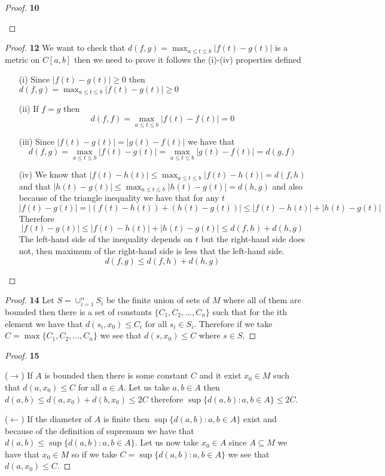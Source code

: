 \documentclass[11pt]{article}
\theoremstyle{definition}
\begin{document}
\begin{proof}{\textbf{10}}
\begin{itemize}
        \end{itemize}
    \end{proof}
\cleardoublepage
	\begin{proof}{\textbf{12}}
        We want to check that $d(f,g) = \max_{a\leq t\leq b} |f(t) - g(t)|$ is a metric
        on $C[a,b]$ then we need to prove it follows the (i)-(iv) properties defined
        \begin{itemize}
            \item [(i)] Since $|f(t) - g(t)| \geq 0$ then
            $d(f,g) = \max_{a\leq t\leq b} |f(t) - g(t)| \geq 0$
            \item [(ii)] If $f = g$ then 
            $$d(f,f) = \max_{a\leq t\leq b} |f(t) - f(t)| = 0$$
            \item [(iii)] Since $|f(t) - g(t)| = |g(t)-f(t)|$ we have that
            $$d(f,g) = \max_{a\leq t\leq b} |f(t) - g(t)| =
            \max_{a\leq t\leq b} |g(t) - f(t)| = d(g,f)$$
            \item [(iv)] We know that $|f(t) - h(t)| \leq \max_{a\leq t\leq b} |f(t) - h(t)| = d(f,h)$
            and that $|h(t) - g(t)| \leq \max_{a\leq t\leq b} |h(t) - g(t)| = d(h,g)$
            and also because of the triangle inequality we have that for any $t$ 
            $$|f(t)-g(t)| = |(f(t) - h(t)) + (h(t) - g(t))| \leq |f(t) - h(t)| + |h(t) - g(t)|$$
            Therefore
            $$|f(t)-g(t)| \leq |f(t) - h(t)| + |h(t) - g(t)| \leq d(f,h) + d(h,g)$$
            The left-hand side of the inequality depends on $t$ but the right-hand side
            does not, then maximum of the right-hand side is less that the left-hand side.
            $$d(f,g) \leq d(f,h) + d(h,g)$$
        \end{itemize}
    \end{proof}
	\begin{proof}{\textbf{14}}
        Let $S = \cup_{i=1}^n S_i$ be the finite union of sets of $M$ where all of them are
        bounded then there is a set of constants $\{C_1 ,C_2, ..., C_n\}$ such that
        for the ith element we have that $d(s_i, x_0) \leq C_i$ for all $s_i \in S_i$.
        Therefore if we take $ C = \max \{C_1, C_2, ..., C_n\}$ we see that
        $d(s, x_0) \leq C$ where $s \in S$.  
    \end{proof}
	\begin{proof}{\textbf{15}}

        ($\rightarrow$) If $A$ is bounded then there is some constant $C$ and it exist 
        $x_0 \in M$ such that $d(a,x_0) \leq C$ for all $a \in A$. Let us take
        $a,b \in A$ then $d(a,b) \leq d(a,x_0) + d(b,x_0) \leq 2C$ therefore
        $\sup\{d(a,b): a,b \in A\} \leq 2C$.
        
        ($\leftarrow$) If the diameter of $A$ is finite then $\sup\{d(a,b): a,b \in A\}$
        exist and because of the definition of supremum we have that
        $d(a,b) \leq \sup\{d(a,b): a,b \in A\}$. Let us now take $x_0 \in A$ since
        $A \subseteq M$ we have that $x_0 \in M$ so if we take
        $C = \sup\{d(a,b): a,b \in A\}$ we see that $d(a, x_0) \leq C$.
    \end{proof}
\end{document}
